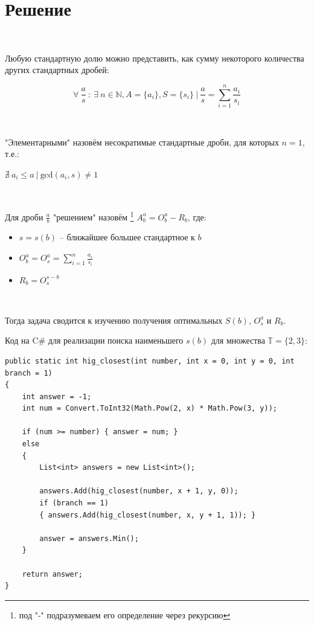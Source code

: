 \vspace{1in}

\section{Решение}

\

\noindent Любую стандартную долю можно представить, как сумму некоторого количества других стандартных дробей:

$$\forall \ \frac{a}{s} \ : \ \exists \ n \in \mathbb{N}, A = \{a_i\}, S = \{s_i\} \ | \ \frac{a}{s} = \sum_{i=1}^n \frac{a_i}{s_i}$$

\

\noindent "Элементарными" назовём несократимые стандартные дроби, для которых $n=1$, т.е.: 

$\nexists \ a_i \le a \ | \ \text{gcd}(a_i, s) \ne 1$

\

\noindent Для дроби $\frac{a}{b}$ "решением" назовём%
\footnote{под "-" подразумеваем его определение через рекурсию}
$A_b^a = O_b^a - R_b$, где:


\begin{itemize}
	\item $s = s(b)$ -- ближайшее большее стандартное к $b$
	
	\item $O_b^a = O_{s}^a = \sum_{i=1}^n \frac{a_i}{s_i}$
	
	\item $R_b = O_{s}^{s-b}$
\end{itemize}

\

\noindent Тогда задача сводится к изучению получения оптимальных $S(b)$, $O_s^a$ и $R_b$.





\vspace{0.5in}

\noindent Код на C\# для реализации поиска наименьшего $s(b)$ для множества $\mathbb{T} = \{ 2, 3 \}$:

\newpage

\begin{lstlisting}[title={C\#}, language={[Sharp]C}]
public static int hig_closest(int number, int x = 0, int y = 0, int branch = 1)
{
	int answer = -1;
	int num = Convert.ToInt32(Math.Pow(2, x) * Math.Pow(3, y));
	
	if (num >= number) { answer = num; }
	else
	{
		List<int> answers = new List<int>();
		
		answers.Add(hig_closest(number, x + 1, y, 0));
		if (branch == 1) 
		{ answers.Add(hig_closest(number, x, y + 1, 1)); }
		
		answer = answers.Min();
	}
	
	return answer;
}
\end{lstlisting}



